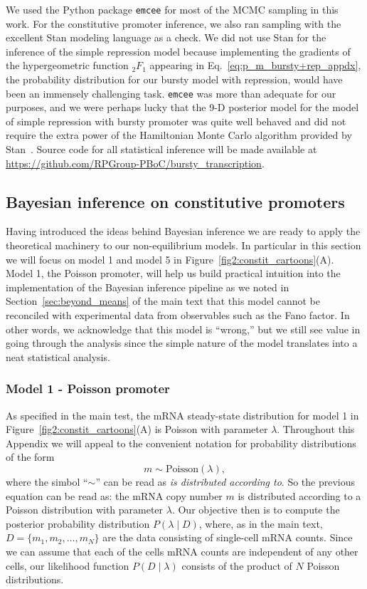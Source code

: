 We used the Python package \texttt{emcee} for most of the MCMC sampling
in this work. For the constitutive promoter inference, we also ran
sampling with the excellent Stan modeling language as a check. We did not
use Stan for the inference of the simple repression model because
implementing the gradients of the hypergeometric function ${_2F_1}$
appearing in Eq.~\ref{eq:p_m_bursty+rep_appdx}, the probability
distribution for our bursty model with repression, would have been
an immensely challenging task. \texttt{emcee} was more than adequate for
our purposes, and we were perhaps lucky that the 9-D posterior model
for the model of simple repression with bursty promoter was quite well
behaved and did not require the extra power of the Hamiltonian Monte
Carlo algorithm provided by Stan~\cite{Carpenter2017}.
Source code for all statistical inference will be made available at
\url{https://github.com/RPGroup-PBoC/bursty_transcription}.

\subsection{Bayesian inference on constitutive promoters}
\label{sec:si_bayes_unreg}

Having introduced the ideas behind Bayesian inference we are ready to apply the
theoretical machinery to our non-equilibrium models. In particular in this
section we will focus on model 1 and model 5 in
Figure~\ref{fig2:constit_cartoons}(A). Model 1, the Poisson promoter, will help
us build practical intuition into the implementation of the Bayesian inference
pipeline as we noted in Section~\ref{sec:beyond_means} of the main text that
this model cannot be reconciled with experimental data from observables such as
the Fano factor. In other words, we acknowledge that this model is ``wrong,''
but we still see value in going through the analysis since the simple nature of
the model translates into a neat statistical analysis.

\subsubsection{Model 1 - Poisson promoter}

As specified in the main test, the mRNA steady-state distribution for model 1 in
Figure~\ref{fig2:constit_cartoons}(A) is Poisson with parameter $\lambda$.
Throughout this Appendix we will appeal to the convenient notation for
probability distributions of the form
\begin{equation}
m \sim \text{Poisson}(\lambda),
\end{equation}
where the simbol ``$\sim$'' can be read as \textit{is distributed according to}.
So the previous equation can be read as: the mRNA copy number $m$ is distributed
according to a Poisson distribution with parameter $\lambda$. Our objective then
is to compute the posterior probability distribution $P(\lambda \mid D)$, where,
as in the main text, $D = \{ m_1, m_2, \ldots, m_N \}$ are the data consisting
of single-cell mRNA counts. Since we can assume that each of the cells mRNA
counts are independent of any other cells, our likelihood function $P(D \mid
\lambda)$ consists of the product of $N$ Poisson distributions.

